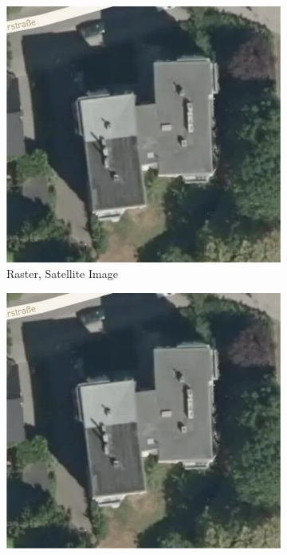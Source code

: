 

\begin{figure}[!htb]
  \centering
  \begin{subfigure}[t]{.30\linewidth}
    \centering\includegraphics[page=1,clip,trim=0cm 0cm 0cm 0cm,width=.99\linewidth]{chapter_1_intro/imgs/gis_types.pdf}
    \caption{\label{fig:ch1_gis_type_a}Raster, Satellite Image}
  \end{subfigure}
  \begin{subfigure}[t]{.30\linewidth}
    \centering\includegraphics[page=2,clip,trim=0cm 0cm 0cm 0cm,width=.99\linewidth]{chapter_1_intro/imgs/gis_types.pdf}

\end{subfigure}
\end{figure}
